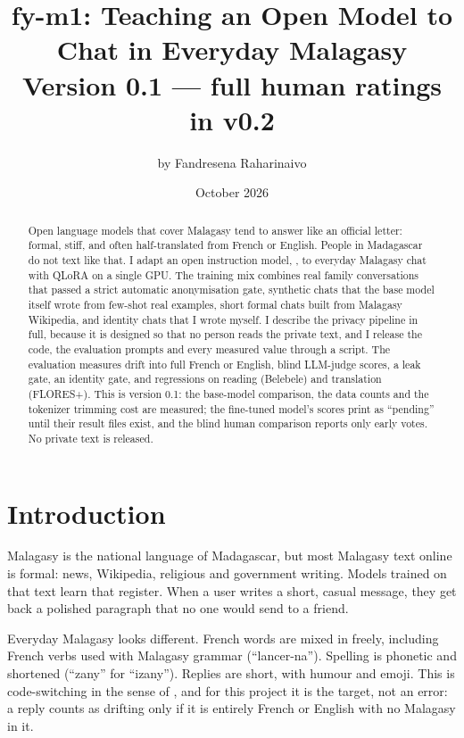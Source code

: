 \documentclass[11pt]{article}
\title{fy-m1: Teaching an Open Model to Chat in Everyday Malagasy\\[0.3em]
  \large Version 0.1 --- full human ratings in v0.2}
\author{by Fandresena Raharinaivo}
\date{October 2026}
\begin{document}
\maketitle

\begin{abstract}
Open language models that cover Malagasy tend to answer like an official letter: formal, stiff, and often
half-translated from French or English. People in Madagascar do not text like that. I adapt an open
instruction model, \fyBaseModel{} \citep{afriqueqwen}, to everyday Malagasy chat with QLoRA on a single
GPU. The training mix combines \fyGateKept{} real family conversations that passed a strict automatic
anonymisation gate, \fySynthGateKept{} synthetic chats that the base model itself wrote from few-shot
real examples, short formal chats built from Malagasy Wikipedia, and identity chats that I wrote myself.
I describe the privacy pipeline in full, because it is designed so that no person reads the private text,
and I release the code, the evaluation prompts and every measured value through a script. The evaluation
measures drift into full French or English, blind LLM-judge scores, a leak gate, an identity gate, and
regressions on reading (Belebele) and translation (FLORES+). This is version 0.1: the base-model
comparison, the data counts and the tokenizer trimming cost are measured; the fine-tuned model's scores
print as ``pending'' until their result files exist, and the blind human comparison reports only early
votes. No private text is released.
\end{abstract}

\section{Introduction}
\label{sec:intro}
Malagasy is the national language of Madagascar, but most
Malagasy text online is formal: news, Wikipedia, religious and government writing. Models trained on
that text learn that register. When a user writes a short, casual message, they get back a polished
paragraph that no one would send to a friend.

Everyday Malagasy looks different. French words are mixed in freely, including French verbs used with
Malagasy grammar (``lancer-na''). Spelling is phonetic and shortened (``zany'' for ``izany''). Replies
are short, with humour and emoji. This is code-switching in the sense of \citet{dogruoz-etal-2021-survey},
and for this project it is the target, not an error: a reply counts as drifting only if it is entirely
French or English with no Malagasy in it.
\end{document}
